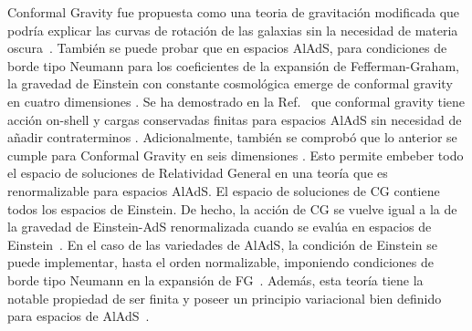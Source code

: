 \documentclass[../Main.tex]{subfiles}
\begin{document}
 
Conformal Gravity fue propuesta como una teoria de gravitación modificada que podría explicar las curvas de rotación de las galaxias sin la necesidad de materia oscura~\cite{Mannheim:1988dj}. También se puede probar que en espacios AlAdS, para condiciones de borde tipo Neumann para los coeficientes de la expansión de Fefferman-Graham, la gravedad de Einstein con constante cosmológica emerge de conformal gravity en cuatro dimensiones \cite{https://doi.org/10.48550/arxiv.1105.5632}. Se ha demostrado en la Ref.~\cite{Grumiller_2014} que conformal gravity tiene acción on-shell y cargas conservadas finitas para espacios AlAdS sin necesidad de añadir contraterminos \cite{Anastasiou:2017rjf}. Adicionalmente, también se comprobó que lo anterior se cumple para Conformal Gravity en seis dimensiones \cite{Anastasiou:2021tlv}. Esto permite embeber todo el espacio de soluciones de Relatividad General en una teoría que es renormalizable para espacios AlAdS. El espacio de soluciones de CG contiene todos los espacios de Einstein. De hecho, la acción de CG se vuelve igual a la de la gravedad de Einstein-AdS renormalizada cuando se evalúa en espacios de Einstein~\cite{Anastasiou:2016jix}. En el caso de las variedades de AlAdS, la condición de Einstein se puede implementar, hasta el orden normalizable, imponiendo condiciones de borde tipo Neumann en la expansión de FG~\cite{Maldacena:2011mk}. Además, esta teoría tiene la notable propiedad de ser finita y poseer un principio variacional bien definido para espacios de AlAdS~\cite{Grumiller:2013mxa}.
\end{document}
